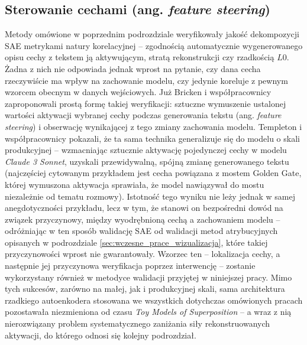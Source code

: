 \subsection{Sterowanie cechami (ang. \textit{feature steering})}
\label{sec:sae_feature_steering}
Metody omówione w poprzednim podrozdziale weryfikowały jakość dekompozycji SAE metrykami natury korelacyjnej -- zgodnością automatycznie wygenerowanego opisu cechy z tekstem ją aktywującym, stratą rekonstrukcji czy rzadkością $L0$. Żadna z nich nie odpowiada jednak wprost na pytanie, czy dana cecha rzeczywiście ma wpływ na zachowanie modelu, czy jedynie koreluje z pewnym wzorcem obecnym w danych wejściowych. Już Bricken i współpracownicy \cite{bricken_2023_towards_monosemanticity_dictionary_learning} zaproponowali prostą formę takiej weryfikacji: sztuczne wymuszenie ustalonej wartości aktywacji wybranej cechy podczas generowania tekstu (ang. \textit{feature steering}) i obserwację wynikającej z tego zmiany zachowania modelu. \newline
Templeton i współpracownicy \cite{templeton_scaling_monosemanticity} pokazali, że ta sama technika generalizuje się do modelu o skali produkcyjnej -- wzmacniając sztucznie aktywację pojedynczej cechy w modelu \textit{Claude 3 Sonnet}, uzyskali przewidywalną, spójną zmianę generowanego tekstu (najczęściej cytowanym przykładem jest cecha powiązana z mostem Golden Gate, której wymuszona aktywacja sprawiała, że model nawiązywał do mostu niezależnie od tematu rozmowy). Istotność tego wyniku nie leży jednak w samej anegdotyczności przykładu, lecz w tym, że stanowi on bezpośredni dowód na związek przyczynowy, między wyodrębnioną cechą a zachowaniem modelu -- odróżniając w ten sposób walidację SAE od walidacji metod atrybucyjnych opisanych w podrozdziale \ref{sec:wczesne_prace_wizualizacja}, które takiej przyczynowości wprost nie gwarantowały. Wzorzec ten -- lokalizacja cechy, a następnie jej przyczynowa weryfikacja poprzez interwencję -- zostanie wykorzystany również w metodyce walidacji przyjętej w niniejszej pracy. \newline
Mimo tych sukcesów, zarówno na małej, jak i produkcyjnej skali, sama architektura rzadkiego autoenkodera stosowana we wszystkich dotychczas omówionych pracach pozostawała niezmieniona od czasu \textit{Toy Models of Superposition} -- a wraz z nią nierozwiązany problem systematycznego zaniżania siły rekonstruowanych aktywacji, do którego odnosi się kolejny podrozdział.

